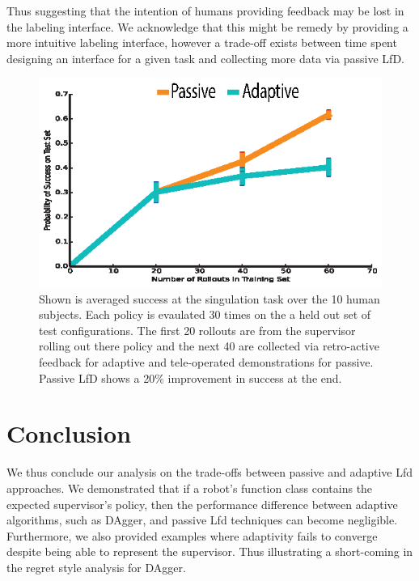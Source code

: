 \documentclass[10pt, conference]{ieeeconf}      %
\begin{document}
Thus suggesting that the intention of humans providing feedback may be lost in the labeling interface. We acknowledge that this might be remedy by providing a more intuitive labeling interface, however a trade-off exists between time spent designing an interface for a given task and collecting more data via passive LfD. 

\begin{figure}
\centering
\includegraphics{f_figs/izzy_reward.eps}
\caption{
    \footnotesize
Shown is averaged success at the singulation task over the 10 human subjects. Each policy is evaulated 30 times on the a held out set of test configurations. The first 20 rollouts are from the supervisor rolling out there policy and the next 40 are collected via retro-active feedback for adaptive and tele-operated demonstrations for passive. Passive LfD shows a 20$\%$ improvement in success at the end. }
\vspace*{-20pt}
\label{fig:izzy_rw}
\end{figure}



\section{Conclusion}
We thus conclude our analysis on the trade-offs between passive and adaptive Lfd approaches. We demonstrated that if a robot's function class contains the expected supervisor's policy, then the  performance difference between adaptive algorithms, such as DAgger,  and passive Lfd techniques can become negligible.  Furthermore, we also provided examples where adaptivity fails to converge despite being able to represent the supervisor. Thus illustrating a short-coming in the regret style analysis for DAgger. 
\end{document}

